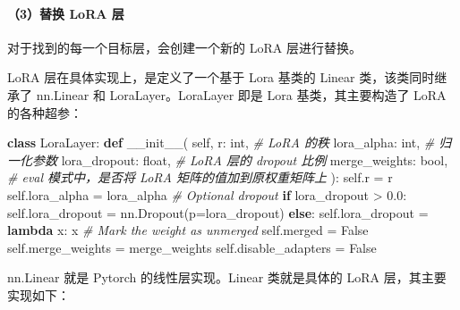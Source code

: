\documentclass[
]{article}
\newenvironment{Shaded}{}{}
\newcommand{\BuiltInTok}[1]{\textcolor[rgb]{0.00,0.50,0.00}{#1}}
\newcommand{\CommentTok}[1]{\textcolor[rgb]{0.38,0.63,0.69}{\textit{#1}}}
\newcommand{\ControlFlowTok}[1]{\textcolor[rgb]{0.00,0.44,0.13}{\textbf{#1}}}
\newcommand{\FloatTok}[1]{\textcolor[rgb]{0.25,0.63,0.44}{#1}}
\newcommand{\FunctionTok}[1]{\textcolor[rgb]{0.02,0.16,0.49}{#1}}
\newcommand{\KeywordTok}[1]{\textcolor[rgb]{0.00,0.44,0.13}{\textbf{#1}}}
\newcommand{\NormalTok}[1]{#1}
\newcommand{\OperatorTok}[1]{\textcolor[rgb]{0.40,0.40,0.40}{#1}}
\newcommand{\VariableTok}[1]{\textcolor[rgb]{0.10,0.09,0.49}{#1}}
\begin{document}
\paragraph{（3）替换 LoRA 层}\label{ux66ffux6362-lora-ux5c42}

对于找到的每一个目标层，会创建一个新的 LoRA 层进行替换。

LoRA 层在具体实现上，是定义了一个基于 Lora 基类的 Linear
类，该类同时继承了 nn.Linear 和 LoraLayer。LoraLayer 即是 Lora
基类，其主要构造了 LoRA 的各种超参：

\begin{Shaded}
\begin{Highlighting}[]
\KeywordTok{class}\NormalTok{ LoraLayer:}
    \KeywordTok{def} \FunctionTok{\_\_init\_\_}\NormalTok{(}
        \VariableTok{self}\NormalTok{,}
\NormalTok{        r: }\BuiltInTok{int}\NormalTok{, }\CommentTok{\# LoRA 的秩}
\NormalTok{        lora\_alpha: }\BuiltInTok{int}\NormalTok{, }\CommentTok{\# 归一化参数}
\NormalTok{        lora\_dropout: }\BuiltInTok{float}\NormalTok{, }\CommentTok{\# LoRA 层的 dropout 比例}
\NormalTok{        merge\_weights: }\BuiltInTok{bool}\NormalTok{, }\CommentTok{\# eval 模式中，是否将 LoRA 矩阵的值加到原权重矩阵上}
\NormalTok{    ):}
        \VariableTok{self}\NormalTok{.r }\OperatorTok{=}\NormalTok{ r}
        \VariableTok{self}\NormalTok{.lora\_alpha }\OperatorTok{=}\NormalTok{ lora\_alpha}
        \CommentTok{\# Optional dropout}
        \ControlFlowTok{if}\NormalTok{ lora\_dropout }\OperatorTok{\textgreater{}} \FloatTok{0.0}\NormalTok{:}
            \VariableTok{self}\NormalTok{.lora\_dropout }\OperatorTok{=}\NormalTok{ nn.Dropout(p}\OperatorTok{=}\NormalTok{lora\_dropout)}
        \ControlFlowTok{else}\NormalTok{:}
            \VariableTok{self}\NormalTok{.lora\_dropout }\OperatorTok{=} \KeywordTok{lambda}\NormalTok{ x: x}
        \CommentTok{\# Mark the weight as unmerged}
        \VariableTok{self}\NormalTok{.merged }\OperatorTok{=} \VariableTok{False}
        \VariableTok{self}\NormalTok{.merge\_weights }\OperatorTok{=}\NormalTok{ merge\_weights}
        \VariableTok{self}\NormalTok{.disable\_adapters }\OperatorTok{=} \VariableTok{False}
\end{Highlighting}
\end{Shaded}

nn.Linear 就是 Pytorch 的线性层实现。Linear 类就是具体的 LoRA
层，其主要实现如下：
\end{document}
